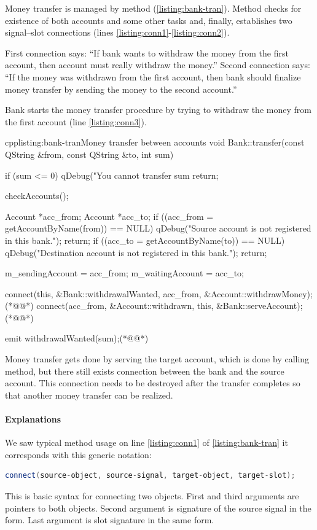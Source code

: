 Money transfer is managed by method (\autoref{listing:bank-tran}). Method checks for existence of both accounts and some other tasks and, finally, establishes two signal--slot connections (lines \ref{listing:conn1}-\ref{listing:conn2}).

First connection says: \enquote{If bank wants to withdraw the money from the first account, then account must really withdraw the money.} Second connection says: \enquote{If the money was withdrawn from the first account, then bank should finalize money transfer by sending the money to the second account.}

Bank starts the money transfer procedure by trying to withdraw the money from the first account (line \ref{listing:conn3}).

\begin{fdoccode}{cpp}{listing:bank-tran}{Money transfer between accounts}
void Bank::transfer(const QString &from, const QString &to, int sum) {
    if (sum <= 0) {
		qDebug("You cannot transfer sum %
		return;
    }

    checkAccounts();

    Account *acc_from;
    Account *acc_to;
    if ((acc_from = getAccountByName(from)) == NULL) {
		qDebug("Source account is not registered in this bank.");
		return;
    }
    if ((acc_to = getAccountByName(to)) == NULL) {
		qDebug("Destination account is not registered in this bank.");
		return;
    }

    m_sendingAccount = acc_from;
    m_waitingAccount = acc_to;

    connect(this, &Bank::withdrawalWanted, acc_from, &Account::withdrawMoney);(*@\label{listing:conn1}@*)
    connect(acc_from, &Account::withdrawn, this, &Bank::serveAccount);(*@\label{listing:conn2}@*)

    emit withdrawalWanted(sum);(*@\label{listing:conn3}@*)
}
\end{fdoccode}

Money transfer gets done by serving the target account, which is done by calling method, but there still exists connection between the bank and the source account. This connection needs to be destroyed after the transfer completes so that another money transfer can be realized.

\paragraph{Explanations}
We saw typical method usage on line \ref{listing:conn1} of \autoref{listing:bank-tran} it corresponds with this generic notation:
\begin{lstlisting}[firstnumber=1,language=cpp]
connect(source-object, source-signal, target-object, target-slot);
\end{lstlisting}
This is basic syntax for connecting two objects. First and third arguments are pointers to both objects. Second argument is signature of the source signal in the form. Last argument is slot signature in the same form.

